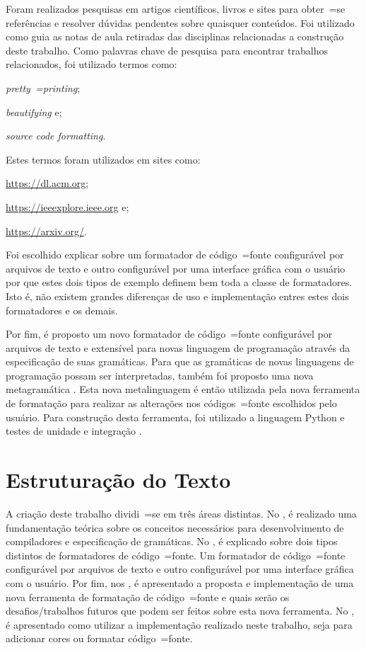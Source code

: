 Foram realizados pesquisas em artigos científicos,
livros e
sites para obter~=se referências e
resolver dúvidas pendentes sobre quaisquer conteúdos.
Foi utilizado como guia as notas de aula retiradas das disciplinas relacionadas a construção deste trabalho.
Como palavras chave de pesquisa para encontrar trabalhos relacionados,
foi utilizado termos como:
\begin{inparaenum}[1)]
\item \textit{pretty~=printing};
\item \textit{beautifying} e;
\item \textit{source code formatting}.
\end{inparaenum}%
Estes termos foram utilizados em sites como:
\begin{inparaenum}[1)]
\item \url{https://dl.acm.org};
\item \url{https://ieeexplore.ieee.org} e;
\item \url{https://arxiv.org/}.
\end{inparaenum}%

Foi escolhido explicar sobre um formatador de código~=fonte configurável por arquivos de texto e
outro configurável por uma interface gráfica com o usuário por que estes dois tipos de exemplo definem bem toda a classe de formatadores.
Isto é,
não existem grandes diferenças de uso e
implementação entres estes dois formatadores e
os demais.

Por fim,
é proposto um novo formatador de código~=fonte configurável por arquivos de texto e
extensível para novas linguagem de programação através da especificação de suas gramáticas.
Para que as gramáticas de novas linguagens de programação possam ser interpretadas,
também foi proposto uma nova metagramática \cite{theUseOfMetaRules}.
Esta nova metalinguagem \cite{compilersCompilerMetaLanguage} é então utilizada pela nova ferramenta de formatação para realizar as alterações nos códigos~=fonte escolhidos pelo usuário.
Para construção desta ferramenta,
foi utilizado a linguagem Python e
testes de unidade e
integração \cite{continuousIntegration}.


\section{Estruturação do Texto}

A criação deste trabalho dividi~=se em três áreas distintas.
No ,
é realizado uma fundamentação teórica sobre os conceitos necessários para desenvolvimento de compiladores e
especificação de gramáticas.
No ,
é explicado sobre dois tipos distintos de formatadores de código~=fonte.
Um formatador de código~=fonte configurável por arquivos de texto e
outro configurável por uma interface gráfica com o usuário.
Por fim,
nos ,
é apresentado a proposta e
implementação de uma nova ferramenta de formatação de código~=fonte e
quais serão os desafios\slash{}trabalhos futuros que podem ser feitos sobre esta nova ferramenta.
No ,
é apresentado como utilizar a implementação realizado neste trabalho,
seja para adicionar cores ou
formatar código~=fonte.
